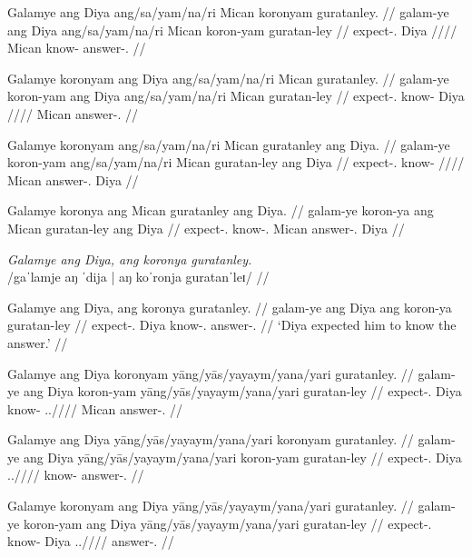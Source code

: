 \documentclass[12pt,a4paper]{scrartcl}
\newcommand{\PargI}{{\Parg}.{\Inan}}
\newcommand{\TsgM}{{\Tsg}.{\M}}
\newcommand{\TsgF}{{\Tsg}.{\F}}
\begin{document}
\a\ljudge*\begingl
\gla Galamye ang Diya ang/sa/yam/na/ri Mican koronyam guratanley. //
\glb galam-ye ang Diya ang/sa/yam/na/ri Mican koron-yam guratan-ley //
\glc expect-\TsgF{} \Aarg{} Diya \Aarg{}/\Parg{}/\Dat{}/\Gen{}/\Ins{} Mican know-\Ptcp{} answer-\PargI{} //
\endgl

\a\ljudge*\begingl
\gla Galamye koronyam ang Diya ang/sa/yam/na/ri Mican guratanley. //
\glb galam-ye koron-yam ang Diya ang/sa/yam/na/ri Mican guratan-ley //
\glc expect-\TsgF{} know-\Ptcp{} \Aarg{} Diya \Aarg{}/\Parg{}/\Dat{}/\Gen{}/\Ins{} Mican answer-\PargI{} //
\endgl

\a\ljudge*\begingl
\gla Galamye koronyam ang/sa/yam/na/ri Mican guratanley ang Diya. //
\glb galam-ye koron-yam ang/sa/yam/na/ri Mican guratan-ley ang Diya //
\glc expect-\TsgF{} know-\Ptcp{} \Aarg{}/\Parg{}/\Dat{}/\Gen{}/\Ins{} Mican answer-\PargI{} \Aarg{} Diya //
\endgl

\a\ljudge*\begingl
\gla Galamye koronya ang Mican guratanley ang Diya. //
\glb galam-ye koron-ya ang Mican guratan-ley ang Diya //
\glc expect-\TsgF{} know-\TsgM{} \Aarg{} Mican answer-\PargI{} \Aarg{} Diya //
\endgl

\xe

\pex
\a\begingl
\glpreamble \textit{Galamye ang Diya, ang koronya guratanley.} \\
	/gaˈlamje aŋ ˈdija | aŋ koˈronja guratanˈleɪ/ //

\gla Galamye ang Diya, ang koronya guratanley. //
\glb galam-ye ang Diya ang koron-ya guratan-ley //
\glc expect-\TsgF{} \Aarg{} Diya \AgtT{} know-\TsgM{} answer-\PargI{} //
\glft `Diya expected him to know the answer.' //
\endgl

\a\ljudge*\begingl
\gla Galamye ang Diya koronyam yāng/yās/yayaym/yana/yari guratanley. //
\glb galam-ye ang Diya koron-yam yāng/yās/yayaym/yana/yari guratan-ley //
\glc expect-\TsgF{} \Aarg{} Diya know-\Ptcp{} \TsgM{}.\Aarg{}/\Parg{}/\Dat{}/\Gen{}/\Ins{} Mican answer-\PargI{} //
\endgl

\a\ljudge*\begingl
\gla Galamye ang Diya yāng/yās/yayaym/yana/yari koronyam guratanley. //
\glb galam-ye ang Diya yāng/yās/yayaym/yana/yari koron-yam guratan-ley //
\glc expect-\TsgF{} \Aarg{} Diya \TsgM{}.\Aarg{}/\Parg{}/\Dat{}/\Gen{}/\Ins{} know-\Ptcp{} answer-\PargI{} //
\endgl

\a\ljudge*\begingl
\gla Galamye koronyam ang Diya yāng/yās/yayaym/yana/yari guratanley. //
\glb galam-ye koron-yam ang Diya yāng/yās/yayaym/yana/yari guratan-ley //
\glc expect-\TsgF{} know-\Ptcp{} \Aarg{} Diya \TsgM{}.\Aarg{}/\Parg{}/\Dat{}/\Gen{}/\Ins{} answer-\PargI{} //
\endgl
\end{document}
